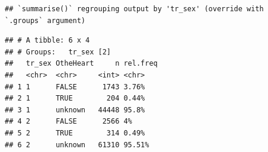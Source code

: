 \documentclass[
]{article}
\newenvironment{Shaded}{\begin{snugshade}}{\end{snugshade}}
\newcommand{\DataTypeTok}[1]{\textcolor[rgb]{0.13,0.29,0.53}{#1}}
\newcommand{\DecValTok}[1]{\textcolor[rgb]{0.00,0.00,0.81}{#1}}
\newcommand{\KeywordTok}[1]{\textcolor[rgb]{0.13,0.29,0.53}{\textbf{#1}}}
\newcommand{\NormalTok}[1]{#1}
\newcommand{\OperatorTok}[1]{\textcolor[rgb]{0.81,0.36,0.00}{\textbf{#1}}}
\newcommand{\OtherTok}[1]{\textcolor[rgb]{0.56,0.35,0.01}{#1}}
\newcommand{\StringTok}[1]{\textcolor[rgb]{0.31,0.60,0.02}{#1}}
\begin{document}
\begin{Shaded}
\end{Shaded}

\begin{verbatim}
## `summarise()` regrouping output by 'tr_sex' (override with `.groups` argument)
\end{verbatim}

\begin{verbatim}
## # A tibble: 6 x 4
## # Groups:   tr_sex [2]
##   tr_sex OtheHeart     n rel.freq
##   <chr>  <chr>     <int> <chr>   
## 1 1      FALSE      1743 3.76%   
## 2 1      TRUE        204 0.44%   
## 3 1      unknown   44448 95.8%   
## 4 2      FALSE      2566 4%      
## 5 2      TRUE        314 0.49%   
## 6 2      unknown   61310 95.51%
\end{verbatim}
\end{document}
